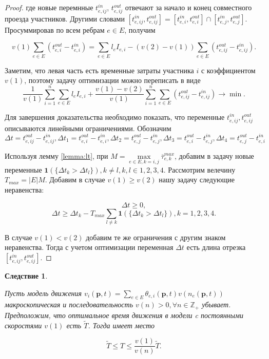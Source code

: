 \documentclass[12pt, a4paper]{article}
\DeclareMathOperator*{\minn}{min}
\newtheorem{corollary}{Следствие}[section]
\begin{document}
\begin{proof}
	где новые перемнные $t_{e, ij}^{in}$, $t_{e, ij}^{out}$ отвечают за начало и конец совместного проезда участников. Другими словами $[t_{e, ij}^{in}, t_{e, ij}^{out}] = [t_{e, i}^{in}, t_{e, i}^{out}] \cap [t_{e, j}^{in}, t_{e, j}^{out}]$. Просуммировав по всем ребрам $e \in E$, получим
	
	$$v(1) \sum \limits _{e \in E} (t_{e, i}^{out} - t_{e, i}^{in}) = \sum \limits _{e \in E} l_e I_{e, i} - (v(2) - v(1)) \sum \limits _{e \in E} (t_{e, ij}^{out} - t_{e, ij}^{in}).$$
	
	Заметим, что левая часть есть временные затраты участника $i$ с коэффициентом $v(1)$, поэтому задачу оптимизации можно переписать в виде
	$$ \frac{1}{v (1)} \sum\limits_{i = 1}^n \sum \limits _{e \in E} l_e I_{e, i} + \frac{v(1) - v(2)}{v (1)}  \sum\limits_{i = 1}^n \sum \limits _{e \in E} (t_{e, ij}^{out} - t_{e, ij}^{in}) \rightarrow \minn .$$
	
	Для завершения доказательства необходимо показать, что переменные $t_{e, ij}^{in}, t_{e, ij}^{out}$ описываются линейными ограничениями. Обозначим $\Delta t = t_{e, ij}^{out} - t_{e, ij}^{in}, \Delta t_1 =  t_{e, i}^{out} - t_{e, i}^{in}, \Delta t_2 =  t_{e, j}^{out} - t_{e, j}^{in}, \Delta t_3 =  t_{e, i}^{out} - t_{e, j}^{in}, \Delta t_4 =  t_{e, j}^{out} - t_{e, i}^{in}$
	
	Используя лемму \ref{lemma:lt}, при $M = \max\limits_{e \in E, k = i, j} \overline{\tau}_{e, k}^{max}$, добавим в задачу новые переменные $\textbf{1} (\{ \Delta t_k > \Delta t_l\}), k \ne l, k, l \in {1, 2, 3, 4}$. Рассмотрим велечину $T_{max} = |E|M$. Добавим в случае $v(1) \ge v(2)$ нашу задачу следующие неравенства: 
	
	$$\Delta t \ge 0, $$
	$$\Delta t \ge \Delta t_k - T_{max} \sum \limits_{l \ne k} {\textbf{1} (\{ \Delta t_k > \Delta t_l\})}, k = 1, 2, 3, 4.$$
	
	В случае $v(1) < v(2)$ добавим те же ограничения с другим знаком неравенства. Тогда с учетом оптимизации переменная $\Delta t$ есть длина отрезка $[t_{e, ij}^{in}, t_{e, ij}^{out}]$. 
	
\end{proof}

\begin{corollary}
	\label{corollary:rel}

	Пусть модель движения $ v_i(\textbf{p}, t) = \sum \limits _{e \in E} \theta_{e, i} (\textbf{p}, t) v (n_e (\textbf{p}, t))$ макроскопическая и последовательность $v(n) > 0, \forall n \in \mathbb{Z}_+$ убывает. Предположим, что оптимальное время движения в модели c постоянными скоростями $v(1)$ есть $\widetilde{T}$. Тогда имеет место

	$$ \widetilde{T} \le T \le \frac {v(1)}{v(n)} \widetilde{T}.$$
	
\end{corollary}
\end{document}
